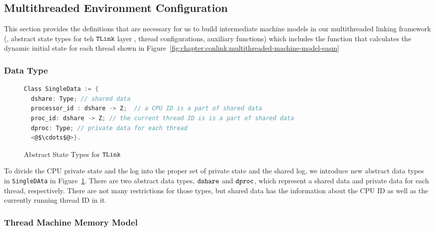 
\subsection{Multithreaded Environment Configuration}
\label{chapter:linking:subsec:multithreaded-env-configuration}

This section provides the definitions 
that are necessary for us to build intermediate machine models in our multithreaded linking framework
(\ie, abstract state types for teh ${{\mathrm{\texttt{TLink}}}}$ layer , thread configurations, auxiliary functions)
which includes the function that calculates the dynamic initial state for each thread shown 
in Figure~\ref{fig:chapter:conlink:multithreaded-machine-model-easm}
%

\subsubsection{Data Type} 

\begin{figure}
\begin{lstlisting}[language=C, morekeywords={Class}]
Class SingleData := {
  dshare: Type; // shared data    
  processor_id : dshare -> Z;  // a CPU ID is a part of shared data
  proc_id: dshare -> Z; // the current thread ID is is a part of shared data
  dproc: Type; // private data for each thread
  <@$\cdots$@>}.
\end{lstlisting} 
\caption{Abstract State Types for ${{\mathrm{\texttt{TLink}}}}$}
\label{fig:chapter:conlink:abs-state-types-for-tlink}
\end{figure}

To divide the CPU private state and the log into the proper set of private state and the shared log, we introduce new abstract data types in \lstinline$SingleDAta$ in Figure~\ref{fig:chapter:conlink:abs-state-types-for-tlink}. 
There are two abstract data types, ${\mathrm{\texttt{dshare}}}$ and ${\mathrm{\texttt{dproc}}}$, 
which represent a shared data and private data for each thread, respectively. 
There are not many restrictions for those types,
but shared data has the information about the 
CPU ID as well as the currently running thread ID in it.


\subsubsection{Thread Machine Memory Model}

